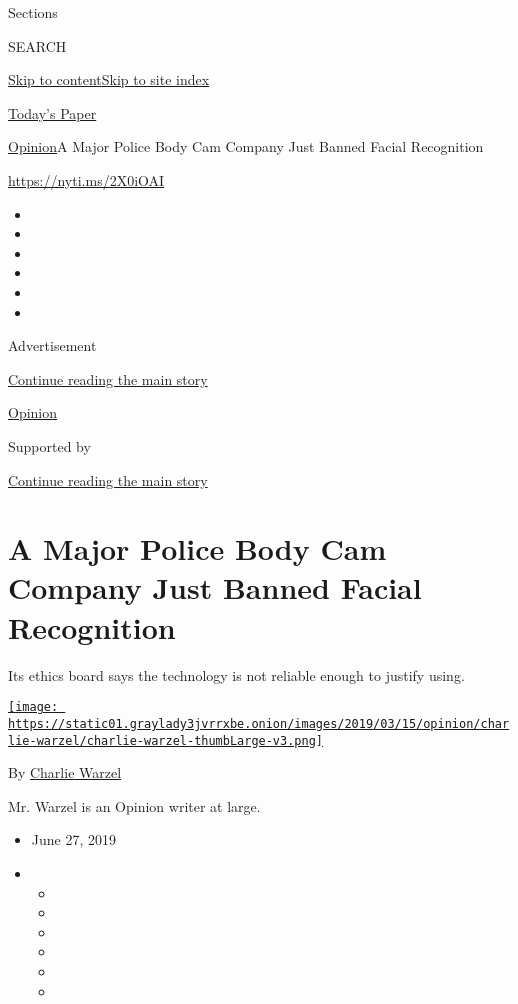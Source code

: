 Sections

SEARCH

\protect\hyperlink{site-content}{Skip to
content}\protect\hyperlink{site-index}{Skip to site index}

\href{https://myaccount.nytimes3xbfgragh.onion/auth/login?response_type=cookie\&client_id=vi}{}

\href{https://www.nytimes3xbfgragh.onion/section/todayspaper}{Today's
Paper}

\href{/section/opinion}{Opinion}\textbar{}A Major Police Body Cam
Company Just Banned Facial Recognition

\url{https://nyti.ms/2X0iOAI}

\begin{itemize}
\item
\item
\item
\item
\item
\item
\end{itemize}

Advertisement

\protect\hyperlink{after-top}{Continue reading the main story}

\href{/section/opinion}{Opinion}

Supported by

\protect\hyperlink{after-sponsor}{Continue reading the main story}

\hypertarget{a-major-police-body-cam-company-just-banned-facial-recognition}{%
\section{A Major Police Body Cam Company Just Banned Facial
Recognition}\label{a-major-police-body-cam-company-just-banned-facial-recognition}}

Its ethics board says the technology is not reliable enough to justify
using.

\href{https://www.nytimes3xbfgragh.onion/by/charlie-warzel}{\texttt{[image: https://static01.graylady3jvrrxbe.onion/images/2019/03/15/opinion/charlie-warzel/charlie-warzel-thumbLarge-v3.png]}}

By \href{https://www.nytimes3xbfgragh.onion/by/charlie-warzel}{Charlie
Warzel}

Mr. Warzel is an Opinion writer at large.

\begin{itemize}
\item
  June 27, 2019
\item
  \begin{itemize}
  \item
  \item
  \item
  \item
  \item
  \item
  \end{itemize}
\end{itemize}

